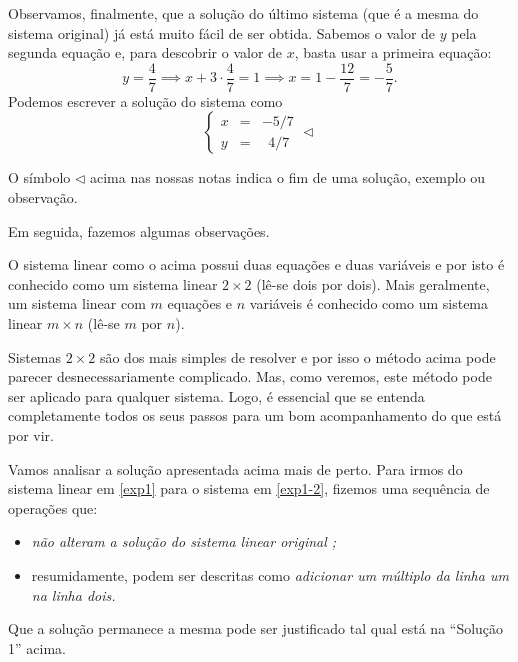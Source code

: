 \begin{ex}
Observamos, finalmente, que a solução do último sistema (que é a mesma do sistema original) já está muito fácil de ser obtida. Sabemos o valor de $y$ pela segunda equação e, para descobrir o valor de $x$, basta usar a primeira equação:
\begin{equation}
y = \frac{4}{7} \implies x + 3\cdot \frac{4}{7} = 1 \implies x = 1 - \frac{12}{7} = - \frac{5}{7}.
\end{equation} Podemos escrever a solução do sistema como
\begin{equation}
  \left\{
    \begin{array}{rcl}
      x&=&-5/7 \\
      y&=& \ \ 4/7
    \end{array}
  \right. \lhd
\end{equation}
\end{ex}

O símbolo $\lhd$ acima nas nossas notas indica o fim de uma solução, exemplo ou observação.

Em seguida, fazemos algumas observações.

\begin{obs}
O sistema linear como o acima possui duas equações e duas variáveis e por isto é conhecido como um sistema linear $2\times 2$ (lê-se dois por dois). Mais geralmente, um sistema linear com $m$ equações e $n$ variáveis é conhecido como um sistema linear $m \times n$ (lê-se $m$ por $n$).
\end{obs}

\begin{obs}
Sistemas $2\times 2$ são dos mais simples de resolver e por isso o método acima pode parecer desnecessariamente complicado. Mas, como veremos, este método pode ser aplicado para qualquer sistema. Logo, é essencial que se entenda completamente todos os seus passos para um bom acompanhamento do que está por vir.
\end{obs}

Vamos analisar a solução apresentada acima mais de perto. Para irmos do sistema linear em \eqref{exp1} para o sistema em \eqref{exp1-2}, fizemos uma sequência de operações que:
\begin{itemize}
  \item \emph{não alteram a solução do sistema linear original ;}
  \item resumidamente, podem ser descritas como \emph{adicionar um múltiplo da linha um na linha dois.}
\end{itemize} Que a solução permanece a mesma pode ser justificado tal qual está na ``Solução 1'' acima.

